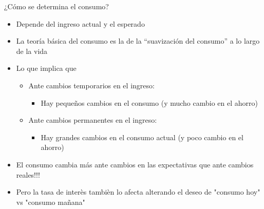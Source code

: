 \documentclass{beamer}
\begin{document}
\begin{frame}{¿Cómo se determina el consumo?}
    \begin{itemize}
        \item Depende del ingreso actual y el esperado
        \item La teoría básica del consumo es la de la “suavización del consumo” a lo largo de la vida
        \item Lo que implica que 
            \begin{itemize}
            \item Ante cambios temporarios en el ingreso:
                \begin{itemize}
                \item Hay pequeños cambios en el consumo (y mucho cambio en el ahorro)
                \end{itemize}            
            \item Ante cambios permanentes en el ingreso:
                \begin{itemize}
                \item Hay grandes cambios en el consumo actual (y poco cambio en el ahorro)
                \end{itemize}
            \end{itemize}
        \item El consumo cambia más ante cambios en las expectativas que ante cambios reales!!!
        \item Pero la tasa de interès tambièn lo afecta alterando el deseo de "consumo hoy" vs "consumo mañana"
    \end{itemize}
\end{frame}
\end{document}
